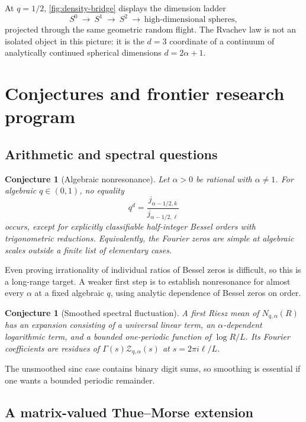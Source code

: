 \documentclass[11pt]{article}
\newtheorem{conjecture}[theorem]{Conjecture}
\theoremstyle{definition}
\theoremstyle{remark}
\newcommand{\Zcal}{\mathcal{Z}}
\begin{document}
At \(q=1/2\), \cref{fig:density-bridge} displays the dimension ladder
\[
 S^0\ \longrightarrow\ S^1\ \longrightarrow\ S^2
 \ \longrightarrow\ \text{high-dimensional spheres},
\]
projected through the same geometric random flight.  The Rvachev law is not an
isolated object in this picture: it is the \(d=3\) coordinate of a continuum
of analytically continued spherical dimensions \(d=2\alpha+1\).

\section{Conjectures and frontier research program}
\label{sec:future}

\subsection{Arithmetic and spectral questions}

\begin{conjecture}[Algebraic nonresonance]
\label{conj:algebraic-nonresonance}
Let \(\alpha>0\) be rational with \(\alpha\ne1\).  For algebraic
\(q\in(0,1)\), no equality
\[
 q^d=\frac{j_{\alpha-1/2,k}}{j_{\alpha-1/2,\ell}}
\]
occurs, except for explicitly classifiable half-integer Bessel orders with
trigonometric reductions.  Equivalently, the Fourier zeros are simple at
algebraic scales outside a finite list of elementary cases.
\end{conjecture}

Even proving irrationality of individual ratios of Bessel zeros is difficult,
so this is a long-range target.  A weaker first step is to establish
nonresonance for almost every \(\alpha\) at a fixed algebraic \(q\), using
analytic dependence of Bessel zeros on order.

\begin{conjecture}[Smoothed spectral fluctuation]
\label{conj:spectral-fluctuation}
A first Riesz mean of \(N_{q,\alpha}(R)\) has an expansion consisting of a
universal linear term, an \(\alpha\)-dependent logarithmic term, and a bounded
one-periodic function of \(\log R/L\).  Its Fourier coefficients are residues
of \(\Gamma(s)\Zcal_{q,\alpha}(s)\) at \(s=2\pi i\ell/L\).
\end{conjecture}

The unsmoothed sinc case contains binary digit sums, so smoothing is essential
if one wants a bounded periodic remainder.

\subsection{A matrix-valued Thue--Morse extension}
\end{document}
